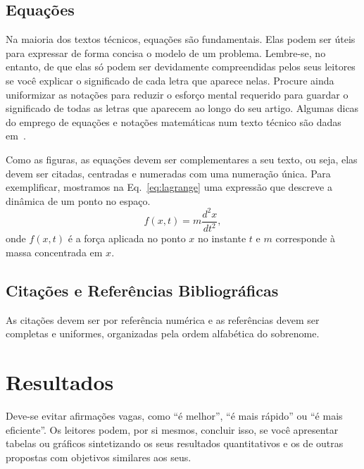\documentclass[11pt]{article}
\begin{document}
\subsection{Equa\c{c}\~{o}es}
\label{ssec:equacoes}

Na maioria dos textos t\'{e}cnicos, equa\c{c}\~{o}es s\~{a}o fundamentais. Elas podem ser \'{u}teis para expressar de forma
concisa o modelo de um problema. Lembre-se, no entanto, de que elas s\'{o} podem ser devidamente compreendidas
pelos seus leitores se voc\^{e} explicar o significado de cada letra que aparece nelas. Procure ainda uniformizar
as nota\c{c}\~{o}es para reduzir o esfor\c{c}o mental requerido para guardar o significado de todas as letras que
aparecem ao longo do seu artigo. Algumas dicas do emprego de equa\c{c}\~{o}es e nota\c{c}\~{o}es matem\'{a}ticas num texto
t\'{e}cnico s\~{a}o dadas em~\cite{K99}.

Como as figuras, as equa\c{c}\~{o}es devem ser complementares a seu texto, ou
seja, elas devem ser citadas, centradas e numeradas com uma numera\c{c}\~{a}o
\'{u}nica. Para exemplificar, mostramos na Eq.~\ref{eq:lagrange} uma
express\~{a}o que descreve a din\^{a}mica de um ponto no espa\c{c}o.
  \begin{equation}
  \label{eq:lagrange}
  f(x,t) = m \frac{d^2x}{dt^2},
  \end{equation}
onde $f(x,t)$ \'{e} a for\c{c}a aplicada no ponto $x$ no instante $t$ e $m$
corresponde \`{a} massa concentrada em $x$.

\subsection{Cita\c{c}\~{o}es e Refer\^{e}ncias Bibliogr\'{a}ficas}

As cita\c{c}\~{o}es devem ser por refer\^{e}ncia num\'{e}rica e as refer\^{e}ncias devem
ser completas e uniformes, organizadas pela ordem alfab\'{e}tica do
sobrenome.

\section{Resultados}

Deve-se evitar afirma\c{c}\~{o}es vagas, como ``\'{e} melhor'', ``\'{e} mais r\'{a}pido''
ou ``\'{e} mais eficiente''. Os leitores podem, por si mesmos, concluir isso,
se voc\^{e} apresentar tabelas ou gr\'{a}ficos sintetizando os seus resultados
quantitativos e os de outras propostas com objetivos similares aos
seus.
\end{document}
